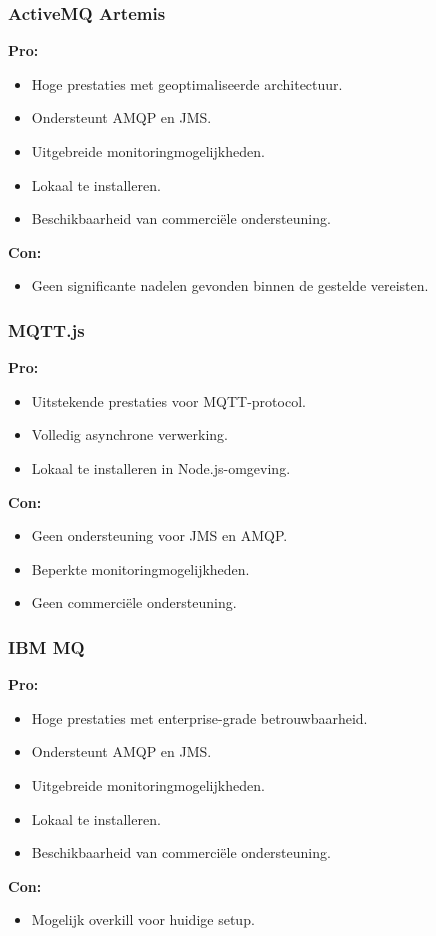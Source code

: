 \subsubsection{ActiveMQ Artemis}
\textbf{Pro:}
\begin{itemize}
    \item Hoge prestaties met geoptimaliseerde architectuur.
    \item Ondersteunt AMQP en JMS.
    \item Uitgebreide monitoringmogelijkheden.
    \item Lokaal te installeren.
    \item Beschikbaarheid van commerciële ondersteuning.
\end{itemize}
\textbf{Con:}
\begin{itemize}
    \item Geen significante nadelen gevonden binnen de gestelde vereisten.
\end{itemize}

\subsubsection{MQTT.js}
\textbf{Pro:}
\begin{itemize}
    \item Uitstekende prestaties voor MQTT-protocol.
    \item Volledig asynchrone verwerking.
    \item Lokaal te installeren in Node.js-omgeving.
\end{itemize}
\textbf{Con:}
\begin{itemize}
    \item Geen ondersteuning voor JMS en AMQP.
    \item Beperkte monitoringmogelijkheden.
    \item Geen commerciële ondersteuning.
\end{itemize}

\subsubsection{IBM MQ}
\textbf{Pro:}
\begin{itemize}
    \item Hoge prestaties met enterprise-grade betrouwbaarheid.
    \item Ondersteunt AMQP en JMS.
    \item Uitgebreide monitoringmogelijkheden.
    \item Lokaal te installeren.
    \item Beschikbaarheid van commerciële ondersteuning.
\end{itemize}
\textbf{Con:}
\begin{itemize}
    \item Mogelijk overkill voor huidige setup.
\end{itemize}

